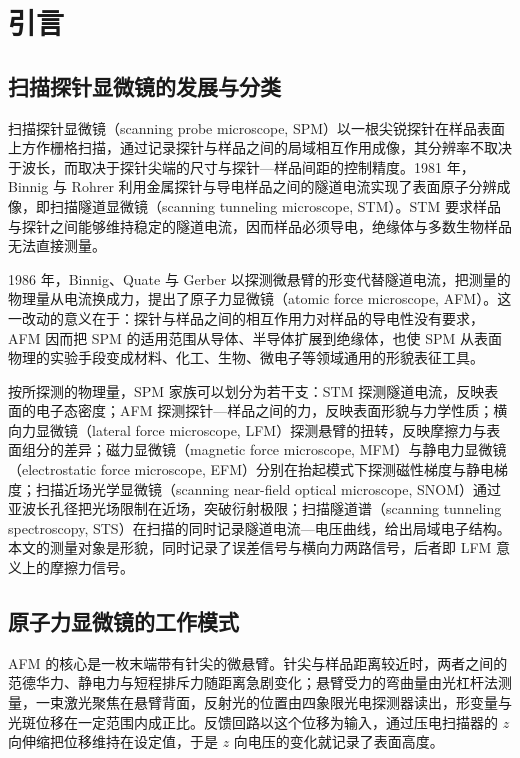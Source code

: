 \section{引言}

\subsection{扫描探针显微镜的发展与分类}

扫描探针显微镜（scanning probe microscope, SPM）以一根尖锐探针在样品表面上方作栅格扫描，通过记录探针与样品之间的局域相互作用成像，其分辨率不取决于波长，而取决于探针尖端的尺寸与探针—样品间距的控制精度。1981 年，Binnig 与 Rohrer 利用金属探针与导电样品之间的隧道电流实现了表面原子分辨成像，即扫描隧道显微镜（scanning tunneling microscope, STM）\cite{binnig1982}。STM 要求样品与探针之间能够维持稳定的隧道电流，因而样品必须导电，绝缘体与多数生物样品无法直接测量。

1986 年，Binnig、Quate 与 Gerber 以探测微悬臂的形变代替隧道电流，把测量的物理量从电流换成力，提出了原子力显微镜（atomic force microscope, AFM）\cite{binnig1986}。这一改动的意义在于：探针与样品之间的相互作用力对样品的导电性没有要求，AFM 因而把 SPM 的适用范围从导体、半导体扩展到绝缘体，也使 SPM 从表面物理的实验手段变成材料、化工、生物、微电子等领域通用的形貌表征工具。

按所探测的物理量，SPM 家族可以划分为若干支：STM 探测隧道电流，反映表面的电子态密度；AFM 探测探针—样品之间的力，反映表面形貌与力学性质；横向力显微镜（lateral force microscope, LFM）探测悬臂的扭转，反映摩擦力与表面组分的差异；磁力显微镜（magnetic force microscope, MFM）与静电力显微镜（electrostatic force microscope, EFM）分别在抬起模式下探测磁性梯度与静电梯度；扫描近场光学显微镜（scanning near-field optical microscope, SNOM）通过亚波长孔径把光场限制在近场，突破衍射极限；扫描隧道谱（scanning tunneling spectroscopy, STS）在扫描的同时记录隧道电流—电压曲线，给出局域电子结构。本文的测量对象是形貌，同时记录了误差信号与横向力两路信号，后者即 LFM 意义上的摩擦力信号。

\subsection{原子力显微镜的工作模式}

AFM 的核心是一枚末端带有针尖的微悬臂。针尖与样品距离较近时，两者之间的范德华力、静电力与短程排斥力随距离急剧变化；悬臂受力的弯曲量由光杠杆法测量，一束激光聚焦在悬臂背面，反射光的位置由四象限光电探测器读出，形变量与光斑位移在一定范围内成正比。反馈回路以这个位移为输入，通过压电扫描器的 $z$ 向伸缩把位移维持在设定值，于是 $z$ 向电压的变化就记录了表面高度。

